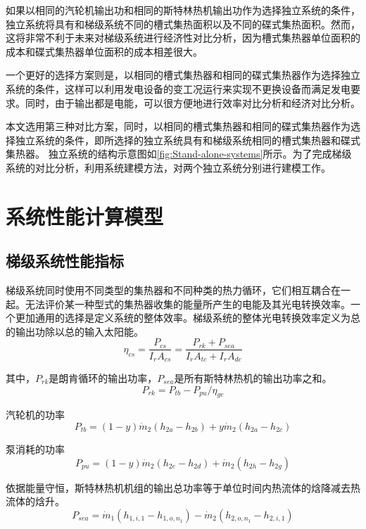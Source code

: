 	如果以相同的汽轮机输出功和相同的斯特林热机输出功作为选择独立系统的条件，独立系统将具有和梯级系统不同的槽式集热面积以及不同的碟式集热面积。然而，这将非常不利于未来对梯级系统进行经济性对比分析，因为槽式集热器单位面积的成本和碟式集热器单位面积的成本相差很大。
	
	一个更好的选择方案则是，以相同的槽式集热器和相同的碟式集热器作为选择独立系统的条件，这样可以利用发电设备的变工况运行来实现不更换设备而满足发电要求。同时，由于输出都是电能，可以很方便地进行效率对比分析和经济对比分析。

本文选用第三种对比方案，同时，以相同的槽式集热器和相同的碟式集热器作为选择独立系统的条件，即所选择的独立系统具有和梯级系统相同的槽式集热器和碟式集热器。
独立系统的结构示意图如\autoref{fig:Stand-alone-systems}所示。为了完成梯级系统的对比分析，利用系统建模方法，对两个独立系统分别进行建模工作。

\section{系统性能计算模型}
\subsection{梯级系统性能指标}

梯级系统同时使用不同类型的集热器和不同种类的热力循环，它们相互耦合在一起。无法评价某一种型式的集热器收集的能量所产生的电能及其光电转换效率。一个更加通用的选择是定义系统的整体效率。梯级系统的整体光电转换效率定义为总的输出功除以总的输入太阳能。
\begin{equation}
	\eta_{cs}=\dfrac{P_{cs}}{I_rA_{cs}} = \dfrac{P_{rk}+ P_{sea}}{I_rA_{tc} + I_rA_{dc}}
\end{equation}

其中，$P_{rk}$是朗肯循环的输出功率，$P_{sea}$是所有斯特林热机的输出功率之和。
\begin{equation}
	P_{rk} = P_{tb} - P_{pu} / \eta_{ge}
\end{equation}

汽轮机的功率
\begin{equation}
  P_{tb}=\left(1-y\right)\dot{m}_{2}\left(h_{2a}-h_{2b}\right)+y\dot{m}_{2}\left(h_{2a}-h_{2c}\right)
\end{equation}

泵消耗的功率
\begin{equation}
	P_{pu}=\left(1-y\right)\dot{m}_{2}\left(h_{2e}-h_{2d}\right)+\dot{m}_{2}\left(h_{2h}-h_{2g}\right)
\end{equation}

依据能量守恒，斯特林热机机组的输出总功率等于单位时间内热流体的焓降减去热流体的焓升。
\begin{equation}
	P_{sea}=\dot{m}_1(h_{1,i,1} - h_{1,o,n_1}) - \dot{m}_2(h_{2,o,n_1} - h_{2,i,1})
\end{equation}

